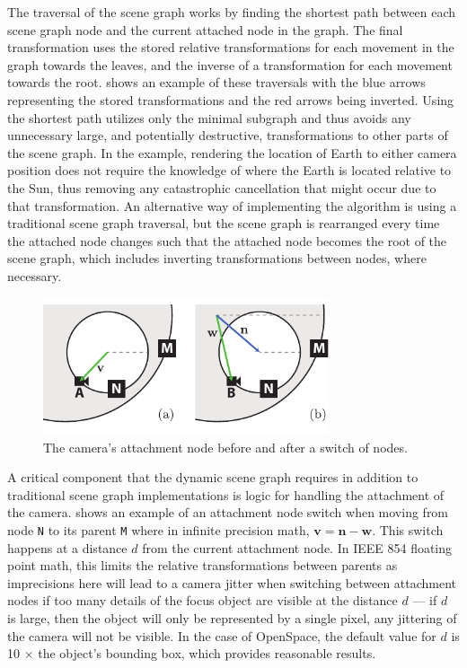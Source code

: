 The traversal of the scene graph works by finding the shortest path between each scene graph node and the current attached node in the graph.  The final transformation uses the stored relative transformations for each movement in the graph towards the leaves, and the inverse of a transformation for each movement towards the root.   shows an example of these traversals with the blue arrows representing the stored transformations and the red arrows being inverted.  Using the shortest path utilizes only the minimal subgraph and thus avoids any unnecessary large, and potentially destructive, transformations to other parts of the scene graph.  In the example, rendering the location of Earth to either camera position does not require the knowledge of where the Earth is located relative to the Sun, thus removing any catastrophic cancellation that might occur due to that transformation.  An alternative way of implementing the algorithm is using a traditional scene graph traversal, but the scene graph is rearranged every time the attached node changes such that the attached node becomes the root of the scene graph, which includes inverting transformations between nodes, where necessary.

\begin{figure}
\centering
\includegraphics[width=0.75\textwidth]{figures/contributions/dsg/attachment-switch.pdf}
\caption{The camera's attachment node before and after a switch of nodes.}
\label{contributions:astro:dsg:switch}
\end{figure}

A critical component that the dynamic scene graph requires in addition to traditional scene graph implementations is logic for handling the attachment of the camera.   shows an example of an attachment node switch when moving from node \texttt{N} to its parent \texttt{M} where in infinite precision math, $\textbf{v} = \textbf{n}-\textbf{w}$.  This switch happens at a distance $d$ from the current attachment node.  In IEEE 854 floating point math, this limits the relative transformations between parents as imprecisions here will lead to a camera jitter when switching between attachment nodes if too many details of the focus object are visible at the distance $d$ --- if $d$ is large, then the object will only be represented by a single pixel, any jittering of the camera will not be visible.  In the case of OpenSpace, the default value for $d$ is 10 $\times$ the object's bounding box, which provides reasonable results.

